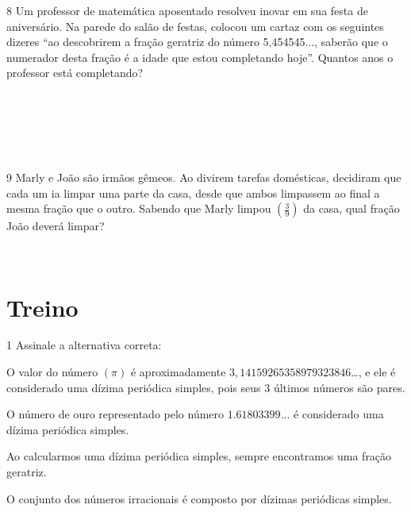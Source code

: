 \num{8} Um professor de matemática aposentado resolveu inovar em sua festa de
aniversário. Na parede do salão de festas, colocou um cartaz com os
seguintes dizeres ``ao descobrirem a fração geratriz do número
5,454545..., saberão que o numerador desta fração é a idade que estou
completando hoje''. Quantos anos o professor está completando?

\\
\\
\\
\\
\\



\num{9} Marly e João são irmãos gêmeos. Ao divirem tarefas domésticas,
decidiram que cada um ia limpar uma parte da casa, desde que ambos
limpassem ao final a mesma fração que o outro. Sabendo que Marly limpou
$(\frac{3}{9})$ da casa, qual fração João deverá limpar?

\\

\section{Treino}

\num{1} Assinale a alternativa correta:

\begin{escolha}[itemsep=0pt]
\item O valor do número $(\pi)$ é aproximadamente
$3,14159265358979323846$\ldots, e ele é considerado uma dízima periódica
simples, pois seus 3 últimos números são pares.
\item O número de ouro representado pelo número $1.61803399$... é considerado
uma dízima periódica simples.
\item Ao calcularmos uma dízima periódica simples, sempre encontramos uma
fração geratriz.
\item O conjunto dos números irracionais é composto por dízimas periódicas
simples.
\end{escolha}


